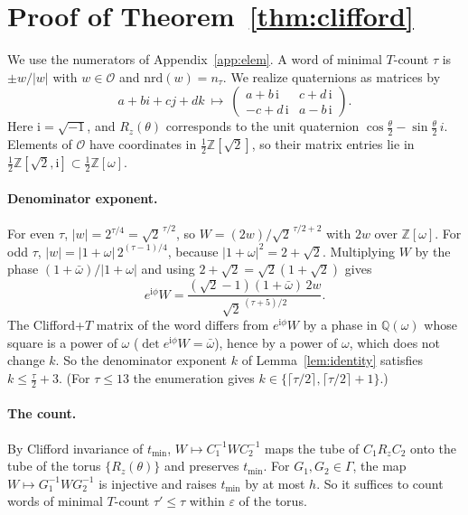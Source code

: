 \documentclass[aps,prx,twocolumn,superscriptaddress,nofootinbib,longbibliography]{revtex4-2}
\theoremstyle{plain}
\theoremstyle{definition}
\theoremstyle{remark}
\newcommand{\Z}{\mathbb{Z}}
\newcommand{\Q}{\mathbb{Q}}
\begin{document}
\section{Proof of Theorem~\ref{thm:clifford}}\label{app:clifford}

We use the numerators of Appendix~\ref{app:elem}. A word of minimal $T$-count $\tau$ is $\pm w/|w|$ with $w\in\mathcal O$ and $\mathrm{nrd}(w)=n_\tau$. We realize quaternions as matrices by
\[
a+bi+cj+dk\ \mapsto\ \begin{pmatrix}a+b\,\mathrm i&c+d\,\mathrm i\\-c+d\,\mathrm i&a-b\,\mathrm i\end{pmatrix}.
\]
Here $\mathrm i=\sqrt{-1}$, and $R_z(\theta)$ corresponds to the unit quaternion $\cos\tfrac\theta2-\sin\tfrac\theta2\,i$. Elements of $\mathcal O$ have coordinates in $\tfrac12\Z[\sqrt2]$, so their matrix entries lie in $\tfrac12\Z[\sqrt2,\mathrm i]\subset\tfrac12\Z[\omega]$.

\paragraph{Denominator exponent.} For even $\tau$, $|w|=2^{\tau/4}=\sqrt2^{\,\tau/2}$, so $W=(2w)/\sqrt2^{\,\tau/2+2}$ with $2w$ over $\Z[\omega]$. For odd $\tau$, $|w|=|1+\omega|\,2^{(\tau-1)/4}$, because $|1+\omega|^2=2+\sqrt2$. Multiplying $W$ by the phase $(1+\bar\omega)/|1+\omega|$ and using $2+\sqrt2=\sqrt2(1+\sqrt2)$ gives
\[
e^{\mathrm i\phi}W=\frac{(\sqrt2-1)(1+\bar\omega)\,2w}{\sqrt2^{\,(\tau+5)/2}} .
\]
The Clifford+$T$ matrix of the word differs from $e^{\mathrm i\phi}W$ by a phase in $\Q(\omega)$ whose square is a power of $\omega$ ($\det e^{\mathrm i\phi}W=\bar\omega$), hence by a power of $\omega$, which does not change $k$. So the denominator exponent $k$ of Lemma~\ref{lem:identity} satisfies $k\le\tfrac\tau2+3$. (For $\tau\le13$ the enumeration gives $k\in\{\lceil\tau/2\rceil,\lceil\tau/2\rceil+1\}$.)

\paragraph{The count.} By Clifford invariance of $t_{\min}$, $W\mapsto C_1^{-1}WC_2^{-1}$ maps the tube of $C_1R_zC_2$ onto the tube of the torus $\{R_z(\theta)\}$ and preserves $t_{\min}$. For $G_1,G_2\in\Gamma$, the map $W\mapsto G_1^{-1}WG_2^{-1}$ is injective and raises $t_{\min}$ by at most $h$. So it suffices to count words of minimal $T$-count $\tau'\le\tau$ within $\varepsilon$ of the torus.
\end{document}
